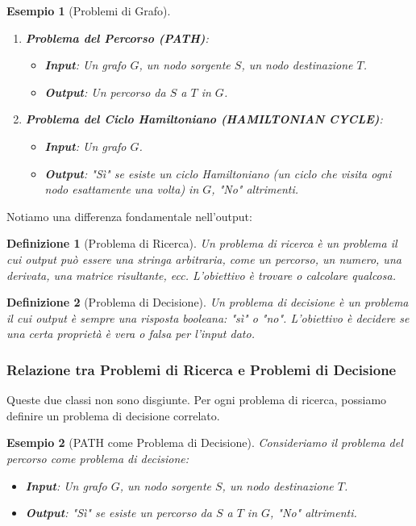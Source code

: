 \documentclass[a4paper]{article}
\newtheorem{definition}{Definizione}
\newtheorem{example}{Esempio}
\begin{document}
\begin{example}[Problemi di Grafo]
\begin{enumerate}
    \item \textbf{Problema del Percorso (PATH)}:
    \begin{itemize}
        \item \textbf{Input}: Un grafo $G$, un nodo sorgente $S$, un nodo destinazione $T$.
        \item \textbf{Output}: Un percorso da $S$ a $T$ in $G$.
    \end{itemize}
    \item \textbf{Problema del Ciclo Hamiltoniano (HAMILTONIAN CYCLE)}:
    \begin{itemize}
        \item \textbf{Input}: Un grafo $G$.
        \item \textbf{Output}: "Sì" se esiste un ciclo Hamiltoniano (un ciclo che visita ogni nodo esattamente una volta) in $G$, "No" altrimenti.
    \end{itemize}
\end{enumerate}
\end{example}

Notiamo una differenza fondamentale nell'output:

\begin{definition}[Problema di Ricerca]
Un problema di ricerca è un problema il cui output può essere una stringa arbitraria, come un percorso, un numero, una derivata, una matrice risultante, ecc. L'obiettivo è trovare o calcolare qualcosa.
\end{definition}

\begin{definition}[Problema di Decisione]
Un problema di decisione è un problema il cui output è sempre una risposta booleana: "sì" o "no". L'obiettivo è decidere se una certa proprietà è vera o falsa per l'input dato.
\end{definition}

\subsubsection{Relazione tra Problemi di Ricerca e Problemi di Decisione}
Queste due classi non sono disgiunte. Per ogni problema di ricerca, possiamo definire un problema di decisione correlato.

\begin{example}[PATH come Problema di Decisione]
Consideriamo il problema del percorso come problema di decisione:
\begin{itemize}
    \item \textbf{Input}: Un grafo $G$, un nodo sorgente $S$, un nodo destinazione $T$.
    \item \textbf{Output}: "Sì" se esiste un percorso da $S$ a $T$ in $G$, "No" altrimenti.
\end{itemize}
\end{example}
\end{document}
